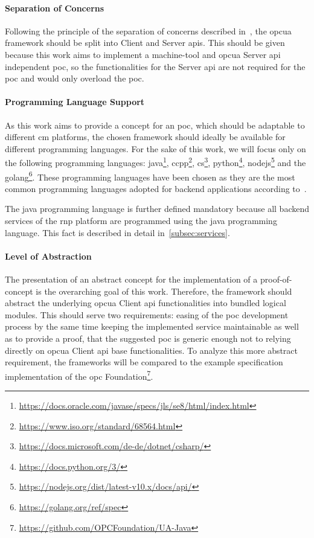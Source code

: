 \documentclass[
a4paper,
twoside,
headsepline,
cleardoublepage=empty,
parskip=half,
draft=false
]{scrbook}
\begin{document}
			\paragraph{Separation of Concerns} Following the principle of the separation of concerns described in~\cite{hursch1995separation}, the \gls{opcua} framework should be split into Client and Server \gls{api}s.
			This should be given because this work aims to implement a machine-tool and \gls{opcua} Server \gls{api} independent \gls{poc}, so the functionalities for the Server \gls{api} are not required for the \gls{poc} and would only overload the \gls{poc}.
			
			\paragraph{Programming Language Support} As this work aims to provide a concept for an \gls{poc}, which should be adaptable to different \gls{cm} platforms, the chosen framework should ideally be available for different programming languages. 
			For the sake of this work, we will focus only on the following programming languages: \gls{java}\footnote{\url{https://docs.oracle.com/javase/specs/jls/se8/html/index.html}}, \gls{ccpp}\footnote{\url{https://www.iso.org/standard/68564.html}}, \gls{cs}\footnote{\url{https://docs.microsoft.com/de-de/dotnet/csharp/}}, \gls{python}\footnote{\url{https://docs.python.org/3/}}, \gls{nodejs}\footnote{\url{https://nodejs.org/dist/latest-v10.x/docs/api/}} and the \gls{golang}\footnote{\url{https://golang.org/ref/spec}}.
			These programming languages have been chosen as they are the most common programming languages adopted for backend applications according to~\cite{jain2017evolution}.
			
			The \gls{java} programming language is further defined mandatory because all backend services of the \gls{rnp} platform are programmed using the \gls{java} programming language.
			This fact is described in detail in~\cref{subsec:services}.
			
			\paragraph{Level of Abstraction} The presentation of an abstract concept for the implementation of a proof-of-concept is the overarching goal of this work. 
			Therefore, the framework should abstract the underlying \gls{opcua} Client \gls{api} functionalities into bundled logical modules. 
			This should serve two requirements: easing of the \gls{poc} development process by the same time  keeping the implemented service maintainable as well as to provide a proof, that the suggested \gls{poc} is generic enough not to relying directly on \gls{opcua} Client \gls{api} base functionalities. 
			To analyze this more abstract requirement, the frameworks will be compared to the example specification implementation of the \gls{opc} Foundation\footnote{\url{https://github.com/OPCFoundation/UA-Java}}. 
			
\end{document}

